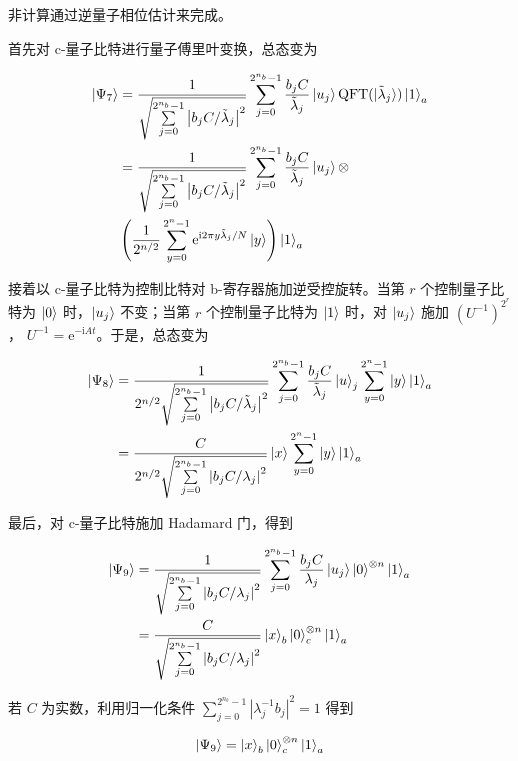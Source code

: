 \documentclass[aps,prl,twocolumn,groupedaddress]{revtex4-2}
\begin{document}
非计算通过逆量子相位估计来完成。

首先对 c-量子比特进行量子傅里叶变换，总态变为

$$
\begin{aligned}
\ket{\Psi_7}
&=\frac{1 }{\sqrt{\sum\limits_{j=0}^{2^{n_b}-1}\left|b_j C/\tilde{\lambda}_j \right|^2} }\sum_{j=0}^{2^{n_b}-1}\frac{b_j C }{\tilde{\lambda}_j }  \ket{u_j}\mathrm{QFT}(\ket{\tilde{\lambda}_j})\ket{1}_a \\
&=\frac{1 }{\sqrt{\sum\limits_{j=0}^{2^{n_b}-1}\left|b_j C/\tilde{\lambda}_j \right|^2} }\sum_{j=0}^{2^{n_b}-1}\frac{b_j C }{\tilde{\lambda}_j }  \ket{u_j}\otimes \\
&\left(\frac{1 }{2^{n/2} } \sum_{y=0}^{2^n-1} \mathrm{e}^{\mathrm{i}2\pi y\tilde{\lambda}_j/N} \ket{y} \right) \ket{1}_a\\
\end{aligned}
$$

接着以 c-量子比特为控制比特对 b-寄存器施加逆受控旋转。当第 $r$ 个控制量子比特为 $\ket{0}$ 时，$\ket{u_j}$ 不变；当第 $r$ 个控制量子比特为 $\ket{1}$ 时，对 $\ket{u_j}$ 施加 $\left(U^{-1} \right)^{2^r}$， $U^{-1}=\mathrm{e}^{-\mathrm{i}At}$。于是，总态变为

$$
\begin{aligned}
\ket{\Psi_8}
&=\frac{1 }{2^{n/2}\sqrt{\sum\limits_{j=0}^{2^{n_b}-1}\left|b_j C/\tilde{\lambda}_j \right|^2} } \sum_{j=0}^{2^{n_b}-1}\frac{b_j C }{\tilde{\lambda}_j }\ket{u}_j \sum_{y=0}^{2^n-1}\ket{y}\ket{1}_a \\
&=\frac{C }{2^{n/2}\sqrt{\sum\limits_{j=0}^{2^{n_b}-1}\left|b_j C/\lambda_j \right|^2} } \ket{x} \sum_{y=0}^{2^n-1} \ket{y}\ket{1}_a
\end{aligned}
$$

最后，对 c-量子比特施加 Hadamard 门，得到

$$
\begin{aligned}
\ket{\Psi_9}
&=\frac{1 }{\sqrt{\sum\limits_{j=0}^{2^{n_b}-1}\left|b_j C/\lambda_j \right|^2} }\sum_{j=0}^{2^{n_b}-1} \frac{b_j C }{\lambda_j } \ket{u_j}\ket{0}^{\otimes n}\ket{1}_a \\
&=\frac{C }{\sqrt{\sum\limits_{j=0}^{2^{n_b}-1}\left|b_j C/\lambda_j \right|^2} }\ket{x}_b\ket{0}_c^{\otimes n}\ket{1}_a
\end{aligned}
$$

若 $C$ 为实数，利用归一化条件 $\displaystyle{\sum_{j=0}^{2^{n_b}-1}\left|\lambda_j^{-1}b_j \right|^2=1 }$ 得到

$$
\ket{\Psi_9}
=\ket{x}_b\ket{0}_c^{\otimes n}\ket{1}_a
$$
\end{document}
